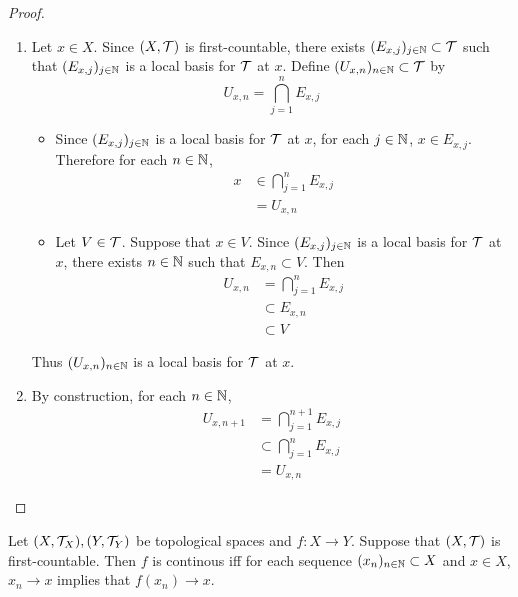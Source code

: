 \documentclass{book}
\begin{document}
	\begin{proof}\
		\begin{enumerate}
			\item Let $x \in X$. Since $(X, \mathcal{T})$ is first-countable, there exists $(E_{x, j})_{j \in \mathbb{N}} \subset \mathcal{T}$ such that $(E_{x, j})_{j \in \mathbb{N}}$ is a local basis for $\mathcal{T}$ at $x$. Define $(U_{x,n})_{n \in \mathbb{N}} \subset \mathcal{T}$ by 
			$$U_{x,n} = \bigcap_{j=1}^n E_{x,j}$$
			\begin{itemize}
				\item Since $(E_{x,j})_{j \in \mathbb{N}}$ is a local basis for $\mathcal{T}$ at $x$, for each $j \in \mathbb{N}$, $x \in E_{x,j}$. Therefore for each $n \in \mathbb{N}$, 
				\begin{align*}
					x 
					& \in \bigcap_{j=1}^n E_{x, j} \\
					& = U_{x,n}
				\end{align*}
				\item Let $V \in \mathcal{T}$. Suppose that $x \in V$. Since $(E_{x,j})_{j \in \mathbb{N}}$ is a local basis for $\mathcal{T}$ at $x$, there exists $n \in \mathbb{N}$ such that $E_{x,n} \subset V$. Then 
				\begin{align*}
					U_{x,n}
					& = \bigcap_{j=1}^n E_{x, j} \\
					& \subset E_{x, n} \\
					& \subset V
				\end{align*}
			\end{itemize}
			Thus $(U_{x,n})_{n \in \mathbb{N}}$ is a local basis for $\mathcal{T}$ at $x$. 
			\item By construction, for each $n \in \mathbb{N}$,
			\begin{align*}
				U_{x, n+1}
				& = \bigcap_{j=1}^{n+1} E_{x, j} \\
				& \subset \bigcap_{j=1}^n E_{x, j} \\
				& = U_{x, n}
			\end{align*}
		\end{enumerate}
	\end{proof}

	\begin{ex} 
		Let $(X, \mathcal{T}_X), (Y, \mathcal{T}_Y)$ be topological spaces and $f: X \rightarrow Y$. Suppose that $(X, \mathcal{T})$ is first-countable. Then $f$ is continous iff for each sequence $(x_n)_{n \in \mathbb{N}} \subset X$ and $x \in X$, $x_n \rightarrow x$ implies that $f(x_n) \rightarrow x$.
	\end{ex}
\end{document}
